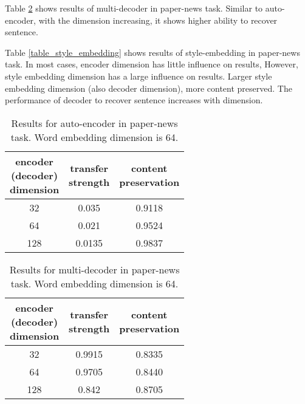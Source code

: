 \documentclass[letterpaper]{article} \usepackage{aaai18}  \usepackage{times}  \usepackage{helvet}  \usepackage{courier}  \usepackage{url}  \usepackage{graphicx}  \usepackage{amsmath}
\begin{document}
Table \ref{table_multi_decoder} shows results of multi-decoder in paper-news task. Similar to auto-encoder, with the dimension increasing, it shows higher ability to recover sentence.

Table \ref{table_style_embedding} shows results of style-embedding in paper-news task. In most cases, encoder dimension has little influence on results, However, style embedding dimension has a large influence on results. Larger style embedding dimension (also decoder dimension), more content preserved. The performance of decoder to recover sentence increases with dimension.


\begin{table}[htb]
\centering
\begin{tabular}{|c|c|c|}
\hline
\makecell{encoder\\(decoder)\\dimension}   & \makecell{transfer\\strength}  & \makecell{content\\preservation}  \\ \hline
32  & 0.035   & 0.9118  \\
64  & 0.021   & 0.9524  \\
128 & 0.0135  & 0.9837  \\ \hline
\end{tabular}
\caption{Results for auto-encoder in paper-news task. Word embedding dimension is 64.}
\label{table_autoencoder}
\end{table}

\begin{table}[htb]
\centering
\begin{tabular}{|c|c|c|}
\hline
\makecell{encoder\\(decoder)\\dimension}   & \makecell{transfer\\strength}  & \makecell{content\\preservation}  \\ \hline
32  & 0.9915 & 0.8335 \\
64  & 0.9705 & 0.8440 \\
128 & 0.842  & 0.8705 \\ \hline
\end{tabular}
\caption{Results for multi-decoder in paper-news task. Word embedding dimension is 64.}
\label{table_multi_decoder}
\end{table}
\end{document}
